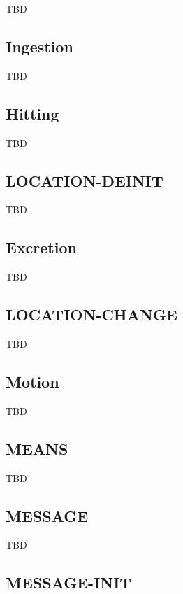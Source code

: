 \documentclass[a4paper]{article}
\newcommand{\fr}[1]{\textsf{#1}}
\begin{document}
TBD

\subsection{\fr{Ingestion}}
\label{sec:Ingestion}

TBD

\subsection{\fr{Hitting}}
\label{sec:Hitting}

TBD

\subsection{\fr{LOCATION-DEINIT}}
\label{sec:LOCATION-DEINIT}

TBD

\subsection{\fr{Excretion}}
\label{sec:Excretion}

TBD

\subsection{\fr{LOCATION-CHANGE}}
\label{sec:LOCATION-CHANGE}

TBD

\subsection{\fr{Motion}}
\label{sec:Motion}

TBD

\subsection{\fr{MEANS}}
\label{sec:MEANS}

TBD

\subsection{\fr{MESSAGE}}
\label{sec:MESSAGE}

TBD

\subsection{\fr{MESSAGE-INIT}}
\label{sec:MESSAGE-INIT}
\end{document}
